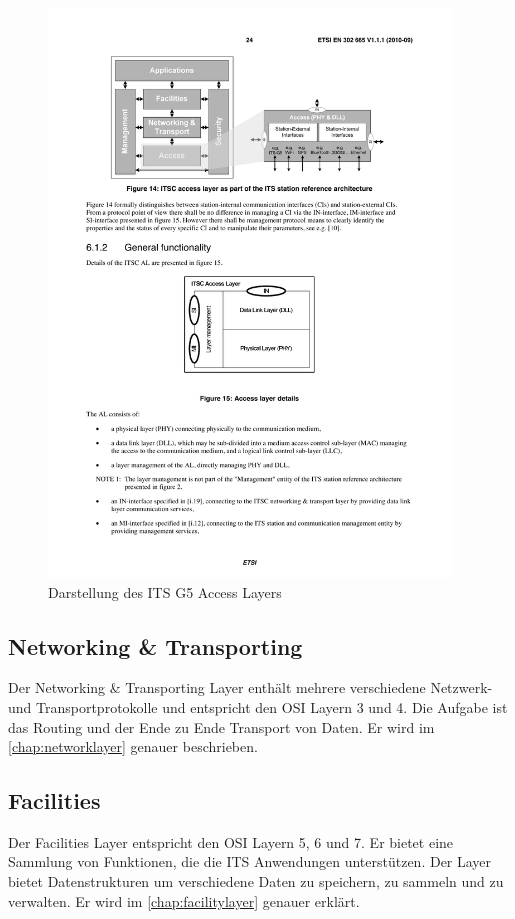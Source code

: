 \begin{figure}
	\includegraphics[width=0.95\textwidth]{content/images/02_architektur/accessLayer.pdf}
	\caption{Darstellung des ITS G5 Access Layers \cite{en302665}}
	\label{fig:architektur_accessLayer}
\end{figure}


\subsection{Networking \& Transporting \label{architektur_networkingTransporting}}
Der Networking \& Transporting Layer enthält mehrere verschiedene Netzwerk- und Transportprotokolle und entspricht den \ac{OSI} Layern 3 und 4. Die Aufgabe ist das Routing und der Ende zu Ende Transport von Daten. Er wird im \autoref{chap:networklayer} genauer beschrieben. 


\subsection{Facilities \label{architektur_facilitiesLayer}}
Der Facilities Layer entspricht den \ac{OSI} Layern 5, 6 und 7. Er bietet eine Sammlung von Funktionen, die die \ac{ITS} Anwendungen unterstützen. Der Layer bietet Datenstrukturen um verschiedene Daten zu speichern, zu sammeln und zu verwalten. Er wird im \autoref{chap:facilitylayer} genauer erklärt.

